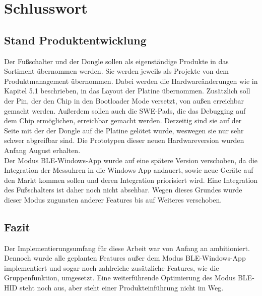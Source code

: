 \section{Schlusswort}

\subsection{Stand Produktentwicklung}
Der Fußschalter und der Dongle sollen als eigenständige Produkte in das Sortiment übernommen werden. Sie werden jeweils als Projekte von dem Produktmanagement übernommen. Dabei werden die Hardwareänderungen wie in Kapitel 5.1 beschrieben, in das Layout der Platine übernommen. Zusätzlich soll der Pin, der den Chip in den Bootloader Mode versetzt, von außen erreichbar gemacht werden. Außerdem sollen auch die SWE-Pads, die das Debugging auf dem Chip ermöglichen, erreichbar gemacht werden. Derzeitig sind sie auf der Seite mit der der Dongle auf die Platine gelötet wurde, weswegen sie nur sehr schwer abgreifbar sind. Die Prototypen dieser neuen Hardwareversion wurden Anfang August erhalten.\\
Der Modus \ac{BLE}-Windows-App wurde auf eine spätere Version verschoben, da die Integration der Messuhren in die Windows App andauert, sowie neue Geräte auf den Markt kommen sollen und deren Integration priorisiert wird. Eine Integration des Fußschalters ist daher noch nicht absehbar. Wegen dieses Grundes wurde dieser Modus zugunsten anderer Features bis auf Weiteres verschoben. 

\subsection{Fazit}
Der Implementierungsumfang für diese Arbeit war von Anfang an ambitioniert. Dennoch wurde alle geplanten Features außer dem Modus \ac{BLE}-Windows-App implementiert und sogar noch zahlreiche zusätzliche Features, wie die Gruppenfunktion, umgesetzt. Eine weiterführende Optimierung des Modus \ac{BLE}-\ac{HID} steht noch aus, aber steht einer Produkteinführung nicht im Weg.